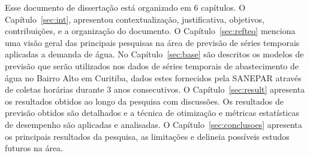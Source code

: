 Esse documento de dissertação está organizado em 6 capítulos. O Capítulo~\ref{sec:int},  apresentou contextualização, justificativa, objetivos, contribuições, e a organização do documento.  O Capítulo~\ref{sec:refteo} menciona uma visão geral das principais pesquisas na área de previsão de séries temporais aplicadas a demanda de água. No Capítulo~\ref{sec:base} são descritos os modelos de previsão que serão utilizados nos dados de séries temporais de abastecimento de água no Bairro Alto em Curitiba, dados estes fornecidos pela SANEPAR através de coletas horárias durante 3 anos consecutivos. O Capítulo~\ref{sec:result} apresenta os resultados obtidos ao longo da pesquisa com discussões. Os resultados de previsão obtidos são detalhados e a técnica de otimização e métricas estatísticas de desempenho são aplicadas e analisadas. O Capítulo~\ref{sec:conclusoes} apresenta os principais resultados da pesquisa, as limitações e delineia possíveis estudos futuros na área. 
